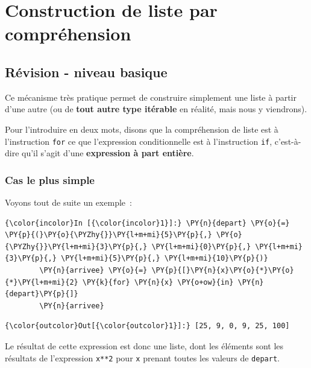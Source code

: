     \hypertarget{construction-de-liste-par-compruxe9hension}{%
\section{Construction de liste par
compréhension}\label{construction-de-liste-par-compruxe9hension}}

    \hypertarget{ruxe9vision---niveau-basique}{%
\subsection{Révision - niveau
basique}\label{ruxe9vision---niveau-basique}}

    Ce mécanisme très pratique permet de construire simplement une liste à
partir d'une autre (ou de \textbf{tout autre type itérable} en réalité,
mais nous y viendrons).

Pour l'introduire en deux mots, disons que la compréhension de liste est
à l'instruction \texttt{for} ce que l'expression conditionnelle est à
l'instruction \texttt{if}, c'est-à-dire qu'il s'agit d'une
\textbf{expression à part entière}.

    \hypertarget{cas-le-plus-simple}{%
\subsubsection{Cas le plus simple}\label{cas-le-plus-simple}}

    Voyons tout de suite un exemple~:

    \begin{Verbatim}[commandchars=\\\{\}]
{\color{incolor}In [{\color{incolor}1}]:} \PY{n}{depart} \PY{o}{=} \PY{p}{(}\PY{o}{\PYZhy{}}\PY{l+m+mi}{5}\PY{p}{,} \PY{o}{\PYZhy{}}\PY{l+m+mi}{3}\PY{p}{,} \PY{l+m+mi}{0}\PY{p}{,} \PY{l+m+mi}{3}\PY{p}{,} \PY{l+m+mi}{5}\PY{p}{,} \PY{l+m+mi}{10}\PY{p}{)}
        \PY{n}{arrivee} \PY{o}{=} \PY{p}{[}\PY{n}{x}\PY{o}{*}\PY{o}{*}\PY{l+m+mi}{2} \PY{k}{for} \PY{n}{x} \PY{o+ow}{in} \PY{n}{depart}\PY{p}{]}
        \PY{n}{arrivee}
\end{Verbatim}


\begin{Verbatim}[commandchars=\\\{\}]
{\color{outcolor}Out[{\color{outcolor}1}]:} [25, 9, 0, 9, 25, 100]
\end{Verbatim}
            
    Le résultat de cette expression est donc une liste, dont les éléments
sont les résultats de l'expression \texttt{x**2} pour \texttt{x} prenant
toutes les valeurs de \texttt{depart}.

